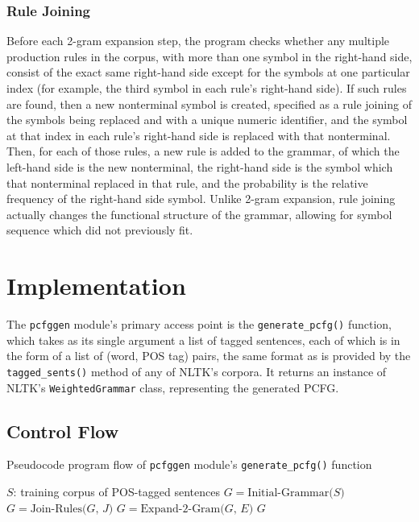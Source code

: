 \documentclass[paper=a4, fontsize=11pt]{scrartcl} %
\numberwithin{equation}{section} %
\numberwithin{figure}{section} %
\numberwithin{table}{section} %
\begin{document}
\subsubsection{Rule Joining}

Before each 2-gram expansion step, the program checks whether any multiple production rules in the corpus, with more than one symbol in the right-hand side, consist of the exact same right-hand side except for the symbols at one particular index (for example, the third symbol in each rule's right-hand side). If such rules are found, then a new nonterminal symbol is created, specified as a rule joining of the symbols being replaced and with a unique numeric identifier, and the symbol at that index in each rule's right-hand side is replaced with that nonterminal. Then, for each of those rules, a new rule is added to the grammar, of which the left-hand side is the new nonterminal, the right-hand side is the symbol which that nonterminal replaced in that rule, and the probability is the relative frequency of the right-hand side symbol. Unlike 2-gram expansion, rule joining actually changes the functional structure of the grammar, allowing for symbol sequence which did not previously fit.


\section{Implementation}

The \texttt{pcfggen} module's primary access point is the \texttt{generate\_pcfg()} function, which takes as its single argument a list of tagged sentences, each of which is in the form of a list of (word, POS tag) pairs, the same format as is provided by the \texttt{tagged\_sents()} method of any of NLTK's corpora. It returns an instance of NLTK's \texttt{WeightedGrammar} class, representing the generated PCFG.

\subsection{Control Flow}

\begin{algorithm}
\caption{Pseudocode program flow of \texttt{pcfggen} module's \texttt{generate\_pcfg()} function}
\begin{algorithmic}
 \Comment $S$: training corpus of POS-tagged sentences
\State $G = \text{Initial-Grammar($S$)}$
\Loop
{}
\State $G = \text{Join-Rules($G$, $J$)}$
\EndWhile
{}
\State $G = \text{Expand-2-Gram($G$, $E$)}$
\Else
\State \Return $G$
\EndIf
\EndLoop
\EndFunction
\end{algorithmic}
\end{algorithm}
\end{document}

